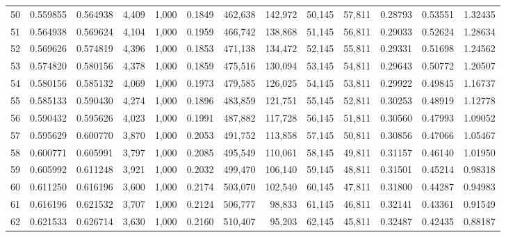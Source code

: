 \begin{tabular}{rrrrrrrrrrrrr}
50  &  0.559855 &  0.564938 &   4,409 &  1,000 &                                     0.1849 &  462,638 &  142,972 &   50,145 &   57,811 &  0.28793 &  0.53551 &  1.32435 \\
51  &  0.564938 &  0.569624 &   4,104 &  1,000 &                                     0.1959 &  466,742 &  138,868 &   51,145 &   56,811 &  0.29033 &  0.52624 &  1.28634 \\
52  &  0.569626 &  0.574819 &   4,396 &  1,000 &                                     0.1853 &  471,138 &  134,472 &   52,145 &   55,811 &  0.29331 &  0.51698 &  1.24562 \\
53  &  0.574820 &  0.580156 &   4,378 &  1,000 &                                     0.1859 &  475,516 &  130,094 &   53,145 &   54,811 &  0.29643 &  0.50772 &  1.20507 \\
54  &  0.580156 &  0.585132 &   4,069 &  1,000 &                                     0.1973 &  479,585 &  126,025 &   54,145 &   53,811 &  0.29922 &  0.49845 &  1.16737 \\
55  &  0.585133 &  0.590430 &   4,274 &  1,000 &                                     0.1896 &  483,859 &  121,751 &   55,145 &   52,811 &  0.30253 &  0.48919 &  1.12778 \\
56  &  0.590432 &  0.595626 &   4,023 &  1,000 &                                     0.1991 &  487,882 &  117,728 &   56,145 &   51,811 &  0.30560 &  0.47993 &  1.09052 \\
57  &  0.595629 &  0.600770 &   3,870 &  1,000 &                                     0.2053 &  491,752 &  113,858 &   57,145 &   50,811 &  0.30856 &  0.47066 &  1.05467 \\
58  &  0.600771 &  0.605991 &   3,797 &  1,000 &                                     0.2085 &  495,549 &  110,061 &   58,145 &   49,811 &  0.31157 &  0.46140 &  1.01950 \\
59  &  0.605992 &  0.611248 &   3,921 &  1,000 &                                     0.2032 &  499,470 &  106,140 &   59,145 &   48,811 &  0.31501 &  0.45214 &  0.98318 \\
60  &  0.611250 &  0.616196 &   3,600 &  1,000 &                                     0.2174 &  503,070 &  102,540 &   60,145 &   47,811 &  0.31800 &  0.44287 &  0.94983 \\
61  &  0.616196 &  0.621532 &   3,707 &  1,000 &                                     0.2124 &  506,777 &   98,833 &   61,145 &   46,811 &  0.32141 &  0.43361 &  0.91549 \\
62  &  0.621533 &  0.626714 &   3,630 &  1,000 &                                     0.2160 &  510,407 &   95,203 &   62,145 &   45,811 &  0.32487 &  0.42435 &  0.88187 \\

\end{tabular}
